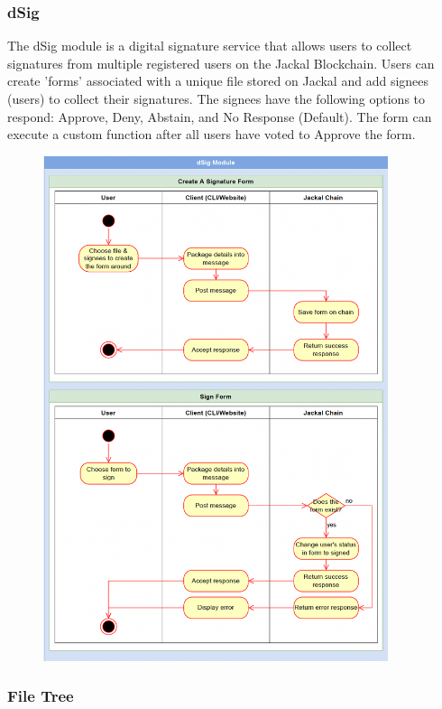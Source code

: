 \documentclass[a4paper]{article}
\begin{document}
\subsubsection{dSig}
The dSig module is a digital signature service that allows users to collect signatures from multiple registered users on the Jackal Blockchain. Users can create 'forms' associated with a unique file stored on Jackal and add signees (users) to collect their signatures. The signees have the following options to respond: Approve, Deny, Abstain, and No Response (Default). The form can execute a custom function after all users have voted to Approve the form.

\begin{figure}[!htbp]
\centering
\includegraphics[width=0.9\textwidth]{assets/dsig.png}
\caption{}
\end{figure}

\newpage
\subsubsection{File Tree}
\end{document}
